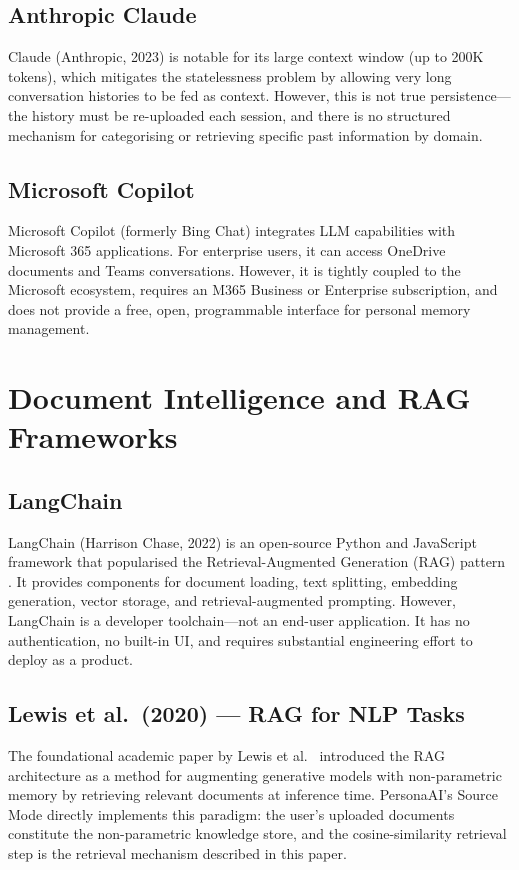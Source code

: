 \documentclass[12pt,a4paper]{report}
\begin{document}
\subsection{Anthropic Claude}
Claude (Anthropic, 2023) is notable for its large context window (up to 200K tokens), which mitigates the statelessness problem by allowing very long conversation histories to be fed as context. However, this is not true persistence—the history must be re-uploaded each session, and there is no structured mechanism for categorising or retrieving specific past information by domain.

\subsection{Microsoft Copilot}
Microsoft Copilot (formerly Bing Chat) integrates LLM capabilities with Microsoft 365 applications. For enterprise users, it can access OneDrive documents and Teams conversations. However, it is tightly coupled to the Microsoft ecosystem, requires an M365 Business or Enterprise subscription, and does not provide a free, open, programmable interface for personal memory management.

\section{Document Intelligence and RAG Frameworks}

\subsection{LangChain}
LangChain (Harrison Chase, 2022) is an open-source Python and JavaScript framework that popularised the Retrieval-Augmented Generation (RAG) pattern \cite{langchain2022}. It provides components for document loading, text splitting, embedding generation, vector storage, and retrieval-augmented prompting. However, LangChain is a developer toolchain—not an end-user application. It has no authentication, no built-in UI, and requires substantial engineering effort to deploy as a product.

\subsection{Lewis et al.\ (2020) — RAG for NLP Tasks}
The foundational academic paper by Lewis et al.\ \cite{lewis2020rag} introduced the RAG architecture as a method for augmenting generative models with non-parametric memory by retrieving relevant documents at inference time. PersonaAI's Source Mode directly implements this paradigm: the user's uploaded documents constitute the non-parametric knowledge store, and the cosine-similarity retrieval step is the retrieval mechanism described in this paper.
\end{document}
